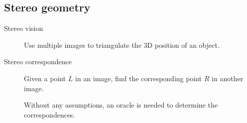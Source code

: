 \subsection{Stereo geometry}

\begin{description}
    \item[Stereo vision] 
        Use multiple images to triangulate the 3D position of an object.
    
    \item[Stereo correspondence] 
        Given a point $L$ in an image, find the corresponding point $R$ in another image.

        Without any assumptions, an oracle is needed to determine the correspondences.
\end{description}

